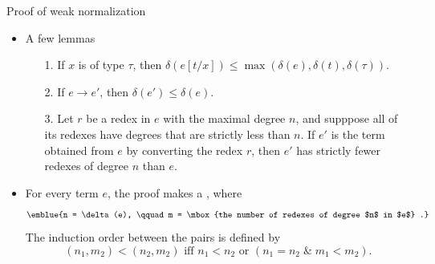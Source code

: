 \documentclass[paper=screen,mode=present,style=zysimple]{powerdot}
\begin{document}
\begin{slide}{Proof of weak normalization}
\begin{itemize}
\item A few lemmas 
\begin{itemize}
\item[1.] If $x$ is of type $\tau$, then $\delta(e[t /x]) \leq  \max(\delta(e), \delta(t), \delta(\tau))$.
\item[2.] If $e \to e'$, then $\delta(e') \leq \delta(e)$.
\item[3.] Let $r$ be a redex in $e$ with the maximal degree $n$, and supppose all of its redexes 
  have degrees that are strictly less than $n$. If $e'$ is the term obtained from $e$ 
  by converting the redex $r$, then $e'$ has strictly fewer redexes of degree $n$ than $e$.
\end{itemize}
\item For every term $e$, the proof makes a , where 
\[
\emblue{n = \delta(e), \qquad m = \mbox{the number of redexes of degree $n$ in $e$} .}
\]
The induction order between the pairs is defined by 
\[
(n_1, m_2) < (n_2, m_2) \mbox{ iff } n_1 < n_2 \mbox{ or } (n_1 = n_2 \;\&\; m_1 < m_2).
\]
\end{itemize}
\end{slide}
\end{document}
